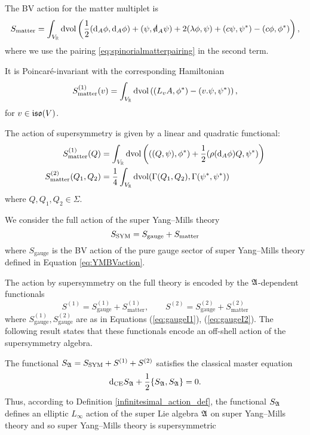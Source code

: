 \documentclass[10pt, oneside]{article}
\newcommand{\gauge}{\mathrm{gauge}}
\newcommand{\matter}{\mathrm{matter}}
\begin{document}
The BV action for the matter multiplet is
\begin{equation}\label{matteraction}
S_{\matter} = \int_{V_\RR} \dvol \left(\frac{1}{2}  (\d_A \phi, \d_A \phi) + (\psi , \sd \d_A \psi) + 2 (\lambda\phi, \psi) + (c\psi, \psi^*) - (c\phi, \phi^*)\right),
\end{equation}
where we use the pairing \eqref{eq:spinorialmatterpairing} in the second term.

It is Poincar\'{e}-invariant with the corresponding Hamiltonian
\begin{equation}
S_{\matter}^{(1)}(v) = \int_{V_\RR}\dvol\left( (L_{v}A, \phi^*) - (v.\psi, \psi^*)\right),
\label{eq:matterPoincareaction}
\end{equation}
for $v\in\mathfrak{iso}(V)$.

The action of supersymmetry is given by a linear and quadratic functional:
\begin{align}
S_{\matter}^{(1)} (Q) & = \int_{V_\RR}\dvol\left( ((Q, \psi), \phi^*) + \frac{1}{2}(\rho(\d_A \phi) Q, \psi^*)\right) \label{eq:matterI1} \\
S_{\matter}^{(2)} (Q_1 , Q_2) & = \frac{1}{4}\int_{V_\RR} \dvol(\Gamma(Q_1, Q_2) , \Gamma(\psi^*, \psi^*)) \label{eq:matterI2}
\end{align}
where $Q, Q_1,Q_2 \in \Sigma$.

We consider the full action of the super Yang--Mills theory
\[S_{\rm SYM} = S_{\gauge} + S_{\matter}\]
where $S_{\gauge}$ is the BV action of the pure gauge sector of super Yang--Mills theory defined in Equation \eqref{eq:YMBVaction}.

The action by supersymmetry on the full theory is encoded by the $\mathfrak A$-dependent functionals
\[S^{(1)} = S^{(1)}_{\gauge} + S^{(1)}_{\matter},\qquad S^{(2)} = S^{(2)}_{\gauge} + S^{(2)}_{\matter}\]
where $S^{(1)}_\gauge, S^{(2)}_\gauge$ are as in Equations (\ref{eq:gaugeI1}), (\ref{eq:gaugeI2}).
The following result states that these functionals encode an off-shell action of the supersymmetry algebra.

\begin{theorem}
The functional $S_{\mathfrak A} = S_{\rm SYM} + S^{(1)} + S^{(2)}$ satisfies the classical master equation
\begin{equation}
\label{CMEYM}
{\rm d}_{\mathrm{CE}} S_\mathfrak A + \frac{1}{2} \{S_\mathfrak A, S_\mathfrak A\} = 0 .
\end{equation}
Thus, according to Definition \ref{infinitesimal_action_def}, the functional $S_{\mathfrak A}$ defines an elliptic $L_\infty$ action of the super Lie algebra $\mathfrak A$ on super Yang--Mills theory and so super Yang--Mills theory is supersymmetric
\label{thm:YMSUSY}
\end{theorem}
\end{document}
